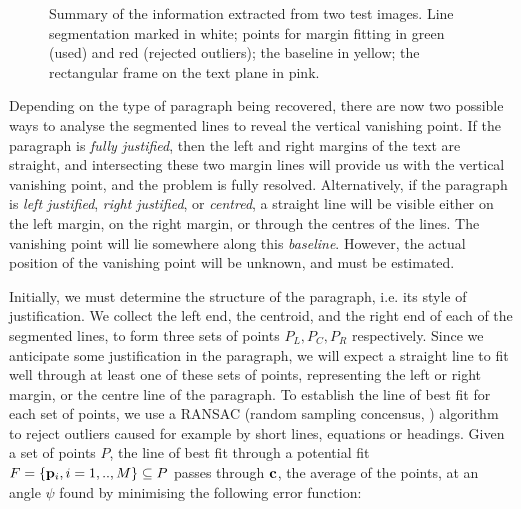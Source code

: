 \begin{figure}[t]
\centering
\begin{center}
\hspace{2mm}
\end{center}
\vspace*{-3mm}
\caption{Summary of the information extracted from two test images.
Line segmentation marked in white;
points for margin fitting in green (used) and red (rejected outliers);
the baseline in yellow;
the rectangular frame on the text plane in pink.}
\label{linesegfig}
\label{summaryfig}
\end{figure}


{ \newbyjoey
Depending on the type of paragraph being recovered, there are now two possible
ways to analyse the segmented lines to reveal the vertical vanishing point.
If the paragraph is {\em fully justified}, then the left and right margins of the text are
straight, and intersecting these two margin lines will provide us with the vertical vanishing point, and the problem is fully resolved.
Alternatively, if the paragraph is {\em left justified}, {\em right justified}, or {\em centred},
a straight line will be visible either on the left margin, on the right margin,
or through the centres of the lines.
The vanishing point will lie somewhere along this {\em baseline}.  However, the actual position of the vanishing
point will be unknown, and must be estimated.
}

Initially, we must determine the structure of the paragraph, i.e. its style of justification.
We collect the left end, the centroid, and the right end of each of the segmented lines,
to form three sets of points $P_L,P_C,P_R$ respectively.
Since we anticipate some justification in the paragraph, we will expect
a straight line to fit well through at least one of these sets of points,
representing the left or right margin, or the centre line of the paragraph.
To establish the line of best fit for each set of points, we
use a RANSAC (random sampling concensus, \cite{bolles81ransac-based}) algorithm
to reject outliers caused for example by short lines, equations or headings.
Given a set of points $P$,
the line of best fit through a potential fit $F=\{{ \bf p }_i, i=1,..,M\}\subseteq P$
passes through ${ \bf c }$, the average of the points,
at an angle $\psi$ found by minimising the following error function:

